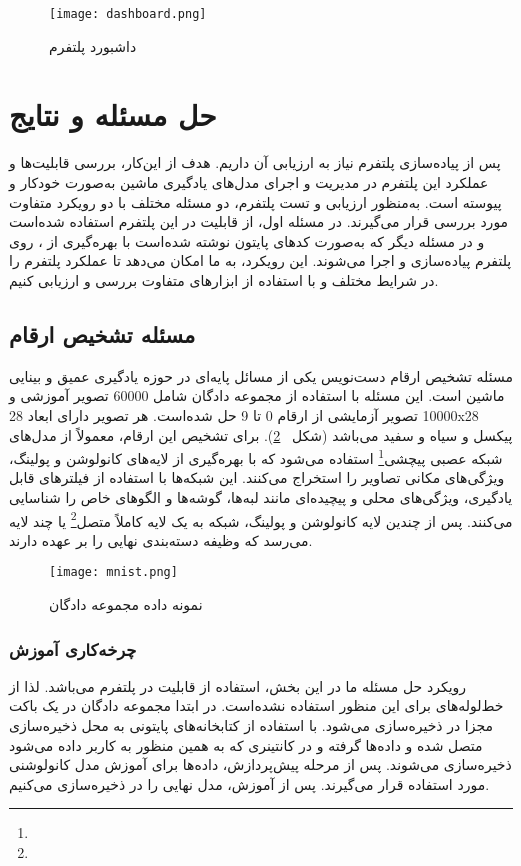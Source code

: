 \begin{figure}[!t]
	\centering
	\texttt{[image: dashboard.png]}
	\caption{داشبورد پلتفرم }
	\label{fig: dashboard}
\end{figure}



\section{حل مسئله و نتایج}
 
پس از پیاده‌سازی پلتفرم  نیاز به ارزیابی آن داریم. هدف از این‌کار، بررسی قابلیت‌ها و عملکرد این پلتفرم در مدیریت و اجرای مدل‌های یادگیری ماشین به‌صورت خودکار و پیوسته است. به‌منظور ارزیابی و تست پلتفرم، دو مسئله مختلف با دو رویکرد متفاوت مورد بررسی قرار می‌گیرند. در مسئله اول، از قابلیت  در این پلتفرم استفاده شده‌است و در مسئله دیگر که به‌صورت کدهای پایتون نوشته شده‌است با بهره‌گیری از ، روی پلتفرم پیاده‌سازی و اجرا می‌شوند. این رویکرد، به ما امکان می‌دهد تا عملکرد پلتفرم را در شرایط مختلف و با استفاده از ابزارهای متفاوت بررسی و ارزیابی کنیم.

\subsection{مسئله تشخیص ارقام}
مسئله تشخیص ارقام دست‌نویس یکی از مسائل پایه‌ای در حوزه یادگیری عمیق و بینایی ماشین است. این مسئله با استفاده از مجموعه دادگان  شامل 60000 تصویر آموزشی و 10000 تصویر آزمایشی از ارقام 0 تا 9 حل شده‌است. هر تصویر دارای ابعاد 28x28 پیکسل و سیاه و سفید می‌باشد (شکل ~\ref{fig: mnist}). برای تشخیص این ارقام، معمولاً از مدل‌های شبکه عصبی پیچشی\footnote{} استفاده می‌شود که با بهره‌گیری از لایه‌های کانولوشن و پولینگ، ویژگی‌های مکانی تصاویر را استخراج می‌کنند. این شبکه‌ها با استفاده از فیلترهای قابل یادگیری، ویژگی‌های محلی و پیچیده‌ای مانند لبه‌ها، گوشه‌ها و الگوهای خاص را شناسایی می‌کنند. پس از چندین لایه کانولوشن و پولینگ، شبکه به یک لایه کاملاً متصل\footnote{} یا چند لایه می‌رسد که وظیفه دسته‌بندی نهایی را بر عهده دارند. 

\begin{figure}[t]
	\centering
	\texttt{[image: mnist.png]}
	\caption{نمونه داده مجموعه دادگان }
	\label{fig: mnist}
\end{figure}

\subsubsection{چرخه‌کاری آموزش}
رویکرد حل مسئله ما در این بخش،‌ استفاده از قابلیت  در پلتفرم می‌باشد. لذا از خط‌لوله‌های  برای این منظور استفاده نشده‌است. در ابتدا مجموعه دادگان  در یک باکت مجزا در  ذخیره‌سازی می‌شود. با استفاده از کتابخانه‌های پایتونی به محل ذخیره‌سازی متصل شده و داده‌ها گرفته و در کانتینری که به همین منظور به کاربر داده می‌شود ذخیره‌سازی می‌شوند. پس از مرحله پیش‌پردازش، داده‌ها برای آموزش مدل کانولوشنی مورد استفاده قرار می‌گیرند. پس از آموزش، مدل نهایی را در  ذخیره‌سازی می‌کنیم. 
